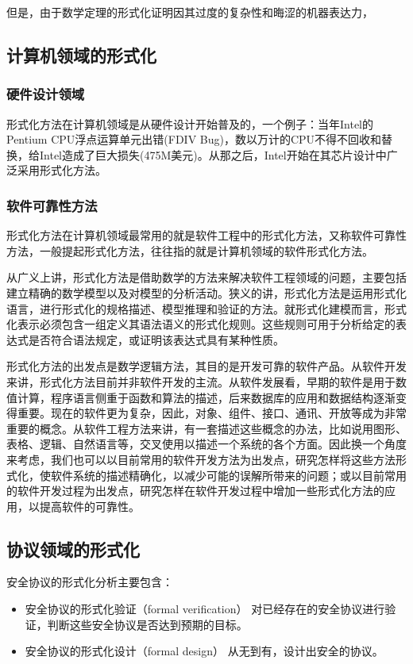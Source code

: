 \documentclass[cs4size,a4pape,UTF8]{ctexart}
\numberwithin{equation}{section}
\numberwithin{table}{section}
\numberwithin{figure}{section}
\begin{document}
但是，由于数学定理的形式化证明因其过度的复杂性和晦涩的机器表达力，

\subsection{计算机领域的形式化}
\subsubsection{硬件设计领域}
形式化方法在计算机领域是从硬件设计开始普及的，一个例子：当年Intel的Pentium CPU浮点运算单元出错(FDIV Bug)，数以万计的CPU不得不回收和替换，给Intel造成了巨大损失(475M美元)。从那之后，Intel开始在其芯片设计中广泛采用形式化方法。

\subsubsection{软件可靠性方法}
形式化方法在计算机领域最常用的就是软件工程中的形式化方法，又称软件可靠性方法，一般提起形式化方法，往往指的就是计算机领域的软件形式化方法。

从广义上讲，形式化方法是借助数学的方法来解决软件工程领域的问题，主要包括建立精确的数学模型以及对模型的分析活动。狭义的讲，形式化方法是运用形式化语言，进行形式化的规格描述、模型推理和验证的方法。就形式化建模而言，形式化表示必须包含一组定义其语法语义的形式化规则。这些规则可用于分析给定的表达式是否符合语法规定，或证明该表达式具有某种性质。

形式化方法的出发点是数学逻辑方法，其目的是开发可靠的软件产品。从软件开发来讲，形式化方法目前并非软件开发的主流。从软件发展看，早期的软件是用于数值计算，程序语言侧重于函数和算法的描述，后来数据库的应用和数据结构逐渐变得重要。现在的软件更为复杂，因此，对象、组件、接口、通讯、开放等成为非常重要的概念。从软件工程方法来讲，有一套描述这些概念的办法，比如说用图形、表格、逻辑、自然语言等，交叉使用以描述一个系统的各个方面。因此换一个角度来考虑，我们也可以以目前常用的软件开发方法为出发点，研究怎样将这些方法形式化，使软件系统的描述精确化，以减少可能的误解所带来的问题；或以目前常用的软件开发过程为出发点，研究怎样在软件开发过程中增加一些形式化方法的应用，以提高软件的可靠性。

\subsection{协议领域的形式化}
安全协议的形式化分析主要包含：

\begin{itemize}
\item 安全协议的形式化验证（formal verification）
对已经存在的安全协议进行验证，判断这些安全协议是否达到预期的目标。
\item 安全协议的形式化设计（formal design）
从无到有，设计出安全的协议。
\end{itemize}
\end{document}
